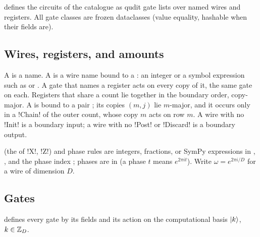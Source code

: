  defines the circuits of the catalogue as qudit gate lists over named
wires and registers. All gate classes are frozen dataclasses (value equality, hashable when
their fields are).

\subsection{Wires, registers, and amounts}

A  is a name. A  is a wire name bound to a : an
integer or a symbol expression such as  or . A gate that names a
register acts on every copy of it, the same gate on each. Registers that share a count lie
together in the boundary order, copy-major. A  is bound to a pair
; its copies $(m,j)$ lie $m$-major, and it occurs only in a
\py!Chain! of the outer count, whose copy $m$ acts on row $m$. A wire with no \py!Init! is a
boundary input; a wire with no \py!Post! or \py!Discard! is a boundary output.

 (the  of \py!X!, \py!Z!) and phase rules are integers, fractions, or
SymPy expressions in , , and the phase index ; phases are in
 (a phase $t$ means $e^{2\pi i t}$). Write $\omega = e^{2\pi i/D}$ for a wire of
dimension $D$.

\subsection{Gates}

 defines every gate by its fields and its action on the computational
basis $\lvert k \rangle$, $k\in\mathbb{Z}_{D}$.

